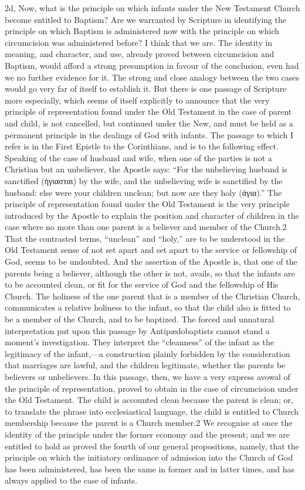 \documentclass[]{book}
\begin{document}
2d, Now, what is the principle on which infants under the New Testament Church become entitled to Baptism? Are we warranted by Scripture in identifying the principle on which Baptism is administered now with the principle on which circumcision was administered before? I think that we are. The identity in meaning, and character, and use, already proved between circumcision and Baptism, would afford a strong presumption in favour of the conclusion, even had we no further evidence for it. The strong and close analogy between the two cases would go very far of itself to establish it. But there is one passage of Scripture more especially, which seems of itself explicitly to announce that the very principle of representation found under the Old Testament in the case of parent and child, is not cancelled, but continued under the New, and must be held as a permanent principle in the dealings of God with infants. The passage to which I refer is in the First Epistle to the Corinthians, and is to the following effect. Speaking of the case of husband and wife, when one of the parties is not a Christian but an unbeliever, the Apostle says: ``For the unbelieving husband is sanctified (ἡγιασται) by the wife, and the unbelieving wife is sanctified by the husband: else were your children unclean; but now are they holy (ἁγια).'' The principle of representation found under the Old Testament is the very principle introduced by the Apostle to explain the position and character of children in the case where no more than one parent is a believer and member of the Church.2 That the contrasted terms, ``unclean'' and ``holy,'' are to be understood in the Old Testament sense of not set apart and set apart to the service or fellowship of God, seems to be undoubted. And the assertion of the Apostle is, that one of the parents being a believer, although the other is not, avails, so that the infants are to be accounted clean, or fit for the service of God and the fellowship of His Church. The holiness of the one parent that is a member of the Christian Church, communicates a relative holiness to the infant, so that the child also is fitted to be a member of the Church, and to be baptized. The forced and unnatural interpretation put upon this passage by Antipædobaptists cannot stand a moment's investigation. They interpret the ``cleanness'' of the infant as the legitimacy of the infant,---a construction plainly forbidden by the consideration that marriages are lawful, and the children legitimate, whether the parents be believers or unbelievers. In this passage, then, we have a very express avowal of the principle of representation, proved to obtain in the case of circumcision under the Old Testament. The child is accounted clean because the parent is clean; or, to translate the phrase into ecclesiastical language, the child is entitled to Church membership because the parent is a Church member.2 We recognise at once the identity of the principle under the former economy and the present; and we are entitled to hold as proved the fourth of our general propositions, namely, that the principle on which the initiatory ordinance of admission into the Church of God has been administered, has been the same in former and in latter times, and has always applied to the case of infants.
\end{document}
